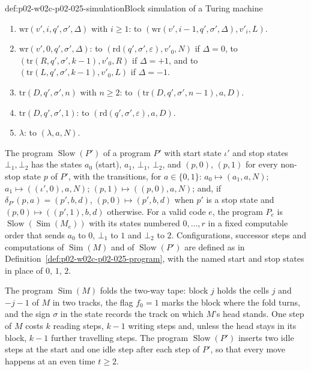 \begin{hbdefinition}{def:p02-w02c-p02-025-simulation}{Block simulation of a Turing machine}
\begin{enumerate}
\item \(\mathrm{wr}(v',i,q',\sigma',\Delta)\) with \(i\geq1\): to
  \((\mathrm{wr}(v',i-1,q',\sigma',\Delta),v'_i,L)\).
\item \(\mathrm{wr}(v',0,q',\sigma',\Delta)\): to
  \((\mathrm{rd}(q',\sigma',\varepsilon),v'_0,N)\) if \(\Delta=0\), to
  \((\mathrm{tr}(R,q',\sigma',k-1),v'_0,R)\) if \(\Delta=+1\), and to
  \((\mathrm{tr}(L,q',\sigma',k-1),v'_0,L)\) if \(\Delta=-1\).
\item \(\mathrm{tr}(D,q',\sigma',n)\) with \(n\geq2\): to
  \((\mathrm{tr}(D,q',\sigma',n-1),a,D)\).
\item \(\mathrm{tr}(D,q',\sigma',1)\): to
  \((\mathrm{rd}(q',\sigma',\varepsilon),a,D)\).
\item \(\lambda\): to \((\lambda,a,N)\).
\end{enumerate}
The program \(\operatorname{Slow}(P')\) of a program \(P'\) with start state
\(\iota'\) and stop states \(\bot_1,\bot_2\) has the states \(a_0\) (start),
\(a_1\), \(\bot_1\), \(\bot_2\), and \((p,0)\), \((p,1)\) for every non-stop
state \(p\) of \(P'\), with the transitions, for \(a\in\{0,1\}\):
\(a_0\mapsto(a_1,a,N)\); \(a_1\mapsto((\iota',0),a,N)\);
\((p,1)\mapsto((p,0),a,N)\); and, if \(\delta_{P'}(p,a)=(p',b,d)\),
\((p,0)\mapsto(p',b,d)\) when \(p'\) is a stop state and
\((p,0)\mapsto((p',1),b,d)\) otherwise.  For a valid code \(e\), the program
\(P_e\) is \(\operatorname{Slow}(\operatorname{Sim}(M_e))\) with its states
numbered \(0,\ldots,r\) in a fixed computable order that sends \(a_0\) to
\(0\), \(\bot_1\) to \(1\) and \(\bot_2\) to \(2\).  Configurations, successor
steps and computations of \(\operatorname{Sim}(M)\) and of
\(\operatorname{Slow}(P')\) are defined as in
Definition~\ref{def:p02-w02c-p02-025-program}, with the named start and stop
states in place of \(0\), \(1\), \(2\).
\end{hbdefinition}

The program \(\operatorname{Sim}(M)\) folds the two-way tape: block \(j\) holds
the cells \(j\) and \(-j-1\) of \(M\) in two tracks, the flag \(f_0=1\) marks
the block where the fold turns, and the sign \(\sigma\) in the state records
the track on which \(M\)'s head stands.  One step of \(M\) costs \(k\) reading
steps, \(k-1\) writing steps and, unless the head stays in its block,
\(k-1\) further travelling steps.  The program \(\operatorname{Slow}(P')\) inserts two idle
steps at the start and one idle step after each step of \(P'\), so that every
move happens at an even time \(t\geq2\).

